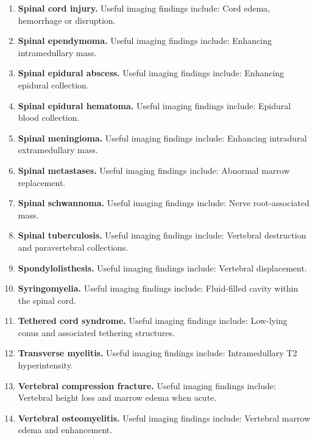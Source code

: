 \begin{enumerate}[leftmargin=*,itemsep=0.45em,topsep=0.4em]
\item \textbf{Spinal cord injury.} Useful imaging findings include: Cord edema, hemorrhage or disruption.
\item \textbf{Spinal ependymoma.} Useful imaging findings include: Enhancing intramedullary mass.
\item \textbf{Spinal epidural abscess.} Useful imaging findings include: Enhancing epidural collection.
\item \textbf{Spinal epidural hematoma.} Useful imaging findings include: Epidural blood collection.
\item \textbf{Spinal meningioma.} Useful imaging findings include: Enhancing intradural extramedullary mass.
\item \textbf{Spinal metastases.} Useful imaging findings include: Abnormal marrow replacement.
\item \textbf{Spinal schwannoma.} Useful imaging findings include: Nerve root-associated mass.
\item \textbf{Spinal tuberculosis.} Useful imaging findings include: Vertebral destruction and paravertebral collections.
\item \textbf{Spondylolisthesis.} Useful imaging findings include: Vertebral displacement.
\item \textbf{Syringomyelia.} Useful imaging findings include: Fluid-filled cavity within the spinal cord.
\item \textbf{Tethered cord syndrome.} Useful imaging findings include: Low-lying conus and associated tethering structures.
\item \textbf{Transverse myelitis.} Useful imaging findings include: Intramedullary T2 hyperintensity.
\item \textbf{Vertebral compression fracture.} Useful imaging findings include: Vertebral height loss and marrow edema when acute.
\item \textbf{Vertebral osteomyelitis.} Useful imaging findings include: Vertebral marrow edema and enhancement.
\end{enumerate}

